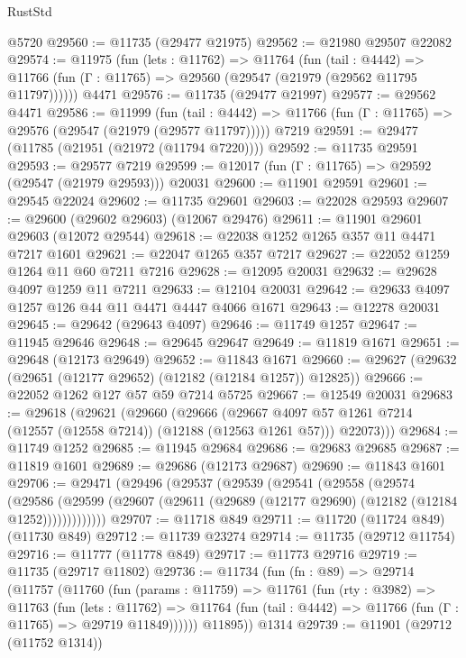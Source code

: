 \begin{lexlean}{RustStd}
\begin{coremodule}
    @5720
@29560 := @11735 (@29477 @21975)
@29562 := @21980 @29507 @22082
@29574 := @11975
    (fun (lets : @11762) =>
    @11764
      (fun (tail : @4442) =>
      @11766 (fun (Γ : @11765) => @29560 (@29547 (@21979 (@29562 @11795 @11797))))))
    @4471
@29576 := @11735 (@29477 @21997)
@29577 := @29562 @4471
@29586 := @11999
    (fun (tail : @4442) => @11766 (fun (Γ : @11765) => @29576 (@29547 (@21979 (@29577 @11797)))))
    @7219
@29591 := @29477 (@11785 (@21951 (@21972 (@11794 @7220))))
@29592 := @11735 @29591
@29593 := @29577 @7219
@29599 := @12017 (fun (Γ : @11765) => @29592 (@29547 (@21979 @29593))) @20031
@29600 := @11901 @29591
@29601 := @29545 @22024
@29602 := @11735 @29601
@29603 := @22028 @29593
@29607 := @29600 (@29602 @29603) (@12067 @29476)
@29611 := @11901 @29601 @29603 (@12072 @29544)
@29618 := @22038 @1252 @1265 @357 @11 @4471 @7217 @1601
@29621 := @22047 @1265 @357 @7217
@29627 := @22052 @1259 @1264 @11 @60 @7211 @7216
@29628 := @12095 @20031
@29632 := @29628 @4097 @1259 @11 @7211
@29633 := @12104 @20031
@29642 := @29633 @4097 @1257 @126 @44 @11 @4471 @4447 @4066 @1671
@29643 := @12278 @20031
@29645 := @29642 (@29643 @4097)
@29646 := @11749 @1257
@29647 := @11945 @29646
@29648 := @29645 @29647
@29649 := @11819 @1671
@29651 := @29648 (@12173 @29649)
@29652 := @11843 @1671
@29660 := @29627 (@29632 (@29651 (@12177 @29652) (@12182 (@12184 @1257)) @12825))
@29666 := @22052 @1262 @127 @57 @59 @7214 @5725
@29667 := @12549 @20031
@29683 := @29618
    (@29621
      (@29660
        (@29666
          (@29667 @4097 @57 @1261 @7214 (@12557 (@12558 @7214)) (@12188 (@12563 @1261 @57)))
          @22073)))
@29684 := @11749 @1252
@29685 := @11945 @29684
@29686 := @29683 @29685
@29687 := @11819 @1601
@29689 := @29686 (@12173 @29687)
@29690 := @11843 @1601
@29706 := @29471
    (@29496
      (@29537
        (@29539
          (@29541
            (@29558
              (@29574
                (@29586
                  (@29599 (@29607 (@29611 (@29689 (@12177 @29690) (@12182 (@12184 @1252)))))))))))))
@29707 := @11718 @849
@29711 := @11720 (@11724 @849) (@11730 @849)
@29712 := @11739 @23274
@29714 := @11735 (@29712 @11754)
@29716 := @11777 (@11778 @849)
@29717 := @11773 @29716
@29719 := @11735 (@29717 @11802)
@29736 := @11734
    (fun (fn : @89) =>
    @29714
      (@11757
        (@11760
          (fun (params : @11759) =>
          @11761
            (fun (rty : @3982) =>
            @11763
              (fun (lets : @11762) =>
              @11764 (fun (tail : @4442) => @11766 (fun (Γ : @11765) => @29719 @11849))))))
        @11895))
    @1314
@29739 := @11901 (@29712 (@11752 @1314))

\end{coremodule}
\end{lexlean}
